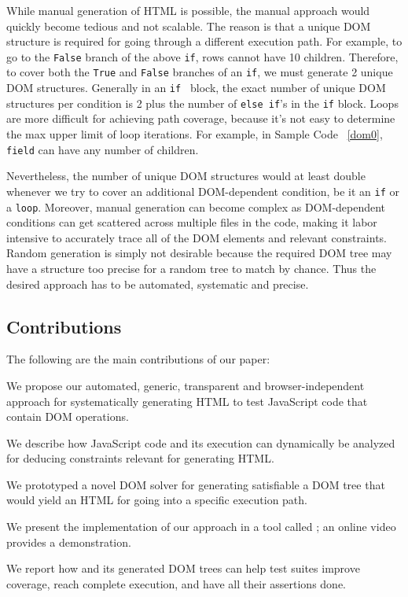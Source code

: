 While manual generation of HTML is possible, the manual approach would quickly become tedious and not scalable.  
The reason is that a unique DOM structure is required for going through a different execution path.
For example, to go to the {\tt False} branch of the above {\tt if}, rows cannot have 10 children.
Therefore, to cover both the {\tt True} and {\tt False} branches of an {\tt if}, we must generate 2 unique DOM structures.  Generally in an {\tt if } block, the exact number of unique DOM structures per condition is 2 plus the number of {\tt else if}'s in the {\tt if} block.  Loops are more difficult for achieving path coverage, because it's not easy to determine the max upper limit of loop iterations.  For example, in Sample Code ~\ref{dom0}, {\tt field} can have any number of children.

Nevertheless, the number of unique DOM structures would at least double whenever we try to cover an additional DOM-dependent condition, be it an {\tt if} or a {\tt loop}.  
Moreover, manual generation can become complex as DOM-dependent conditions can get scattered across multiple files in the code, making it labor intensive to accurately trace all of the DOM elements and relevant constraints.  
Random generation is simply not desirable because the required DOM tree may have a structure too precise for a random tree to match by chance.  
Thus the desired approach has to be automated, systematic and precise.


\subsection{Contributions}
The following are the main contributions of our paper:
\begin {compactitem}
\item We propose our automated, generic, transparent and browser-independent approach for systematically generating HTML to test JavaScript code that contain DOM operations.
\item We describe how JavaScript code and its execution can dynamically be analyzed for deducing constraints relevant for generating HTML.
\item We prototyped a novel DOM solver for generating satisfiable a DOM tree that would yield an HTML for going into a specific execution path. 
\item We present the implementation of our approach in a tool called \tool; an online video provides a demonstration.
\item We report how \tool and its generated DOM trees can help test suites improve coverage, reach complete execution, and have all their assertions done.
\end {compactitem}

